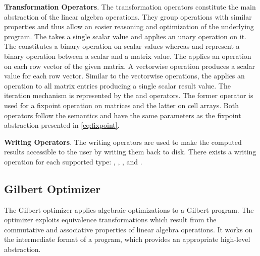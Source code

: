 \textbf{Transformation Operators}. The transformation operators constitute the main abstraction of the linear algebra operations.
They group operations with similar properties and thus allow an easier reasoning and optimization of the underlying program. The  takes a single scalar value and applies an unary operation on it. The  constitutes a binary operation on scalar values whereas  and  represent a binary operation between a scalar and a matrix value. The  applies an operation on each row vector of the given matrix.
A vectorwise operation produces a scalar value for each row vector. Similar to the vectorwise operations, the  applies an operation to all matrix entries producing a single scalar result value. The iteration mechanism is represented by the  and  operators. The former operator is used for a fixpoint operation on matrices and the latter on cell arrays. Both operators follow the semantics and have the same parameters as the fixpoint abstraction presented in \cref{eq:fixpoint}.


\textbf{Writing Operators}. The writing operators are used to make the computed results accessible to the user by writing them back to disk.
There exists a writing operation for each supported type: , , ,  and .

\subsection{Gilbert Optimizer}
\label{sec:gilbertOptimizer}

The Gilbert optimizer applies algebraic optimizations to a Gilbert program.
The optimizer exploits equivalence transformations which result from the commutative and associative properties of linear algebra operations.
It works on the intermediate format of a program, which provides an appropriate high-level abstraction.


